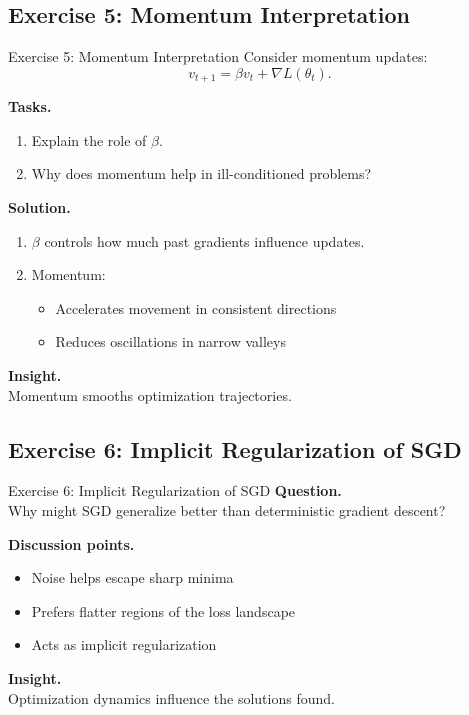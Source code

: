 \documentclass[aspectratio=169,11pt]{beamer}
\begin{document}
\subsection{Exercise 5: Momentum Interpretation}
\begin{frame}[t,allowframebreaks]{Exercise 5: Momentum Interpretation}
\small
Consider momentum updates:
\[
v_{t+1} = \beta v_t + \nabla L(\theta_t).
\]

\textbf{Tasks.}\\ \begin{enumerate}
    \item Explain the role of $\beta$.
    \item Why does momentum help in ill-conditioned problems?
\end{enumerate}

\textbf{Solution.}\\ \begin{enumerate}
\item $\beta$ controls how much past gradients influence updates.

\item Momentum:
\begin{itemize}
    \item Accelerates movement in consistent directions
    \item Reduces oscillations in narrow valleys
\end{itemize}
\end{enumerate}

\textbf{Insight.}\\ Momentum smooths optimization trajectories.
\end{frame}

\subsection{Exercise 6: Implicit Regularization of SGD}
\begin{frame}[t,allowframebreaks]{Exercise 6: Implicit Regularization of SGD}
\small
\textbf{Question.}\\ Why might SGD generalize better than deterministic gradient descent?

\textbf{Discussion points.}\\ \begin{itemize}
    \item Noise helps escape sharp minima
    \item Prefers flatter regions of the loss landscape
    \item Acts as implicit regularization
\end{itemize}

\textbf{Insight.}\\ Optimization dynamics influence the solutions found.
\end{frame}
\end{document}
